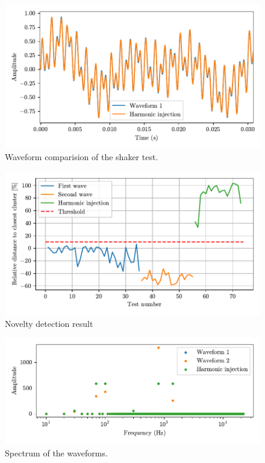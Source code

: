 \begin{figure}
    \centering
    \includegraphics{Images/shaker/Figure_1.pdf}
    \caption{Waveform comparision of the shaker test.}
    \label{fig:shaker}
\end{figure}

\begin{figure}
    \centering
    \includegraphics{Images/shaker/Results.pdf}
    \caption{Novelty detection result}
    \label{fig:shaker_results}
\end{figure}

\begin{figure}
    \centering
    \includegraphics{Images/shaker/spectrum.pdf}
    \caption{Spectrum of the waveforms.}
    \label{fig:shaker_spectrum}
\end{figure}


